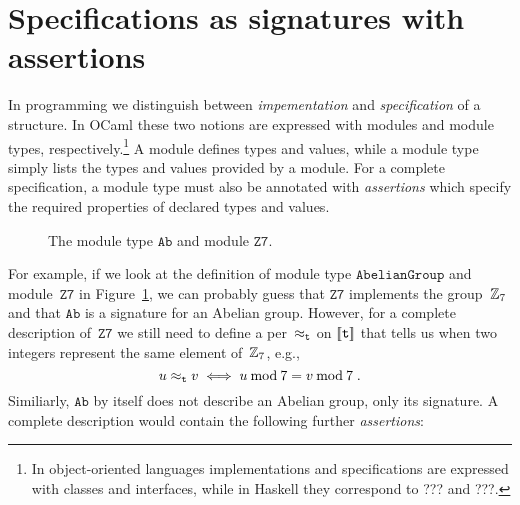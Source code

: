 \section{Specifications as signatures with assertions}
\label{sec:spec-sign-assert}


In programming we distinguish between \emph{impementation} and
\emph{specification} of a structure. In OCaml these two notions are
expressed with modules and module types, respectively.\footnote{In
  object-oriented languages implementations and specifications are
  expressed with classes and interfaces, while in Haskell they
  correspond to ??? and ???.} A module defines types and values, while
a module type simply lists the types and values provided by a module.
For a complete specification, a module type must also be annotated
with \emph{assertions} which specify the required properties of
declared types and values.
%
\begin{figure}
  \centering
  \caption{The module type $\mathtt{Ab}$ and module
    $\mathtt{Z7}$.}
  \label{fig:module-example}
\end{figure}
%
For example, if we look at the definition of module type
$\mathtt{AbelianGroup}$ and module~$\mathtt{Z7}$ in
Figure~\ref{fig:module-example}, we can probably guess that
$\mathtt{Z7}$ implements the group~$\mathbb{Z}_7$ and that $\mathtt{Ab}$ is a
signature for an Abelian group. However, for a complete description
of~$\mathtt{Z7}$ we still need to define a per~$\approx_{\mathtt{t}}$ on
$[\![\mathtt{t}]\!]$ that tells us when two integers represent the
same element of~$\mathbb{Z}_7$, e.g.,
%
\begin{equation*}
  u \approx_{\mathtt{t}} v \iff
  u \mathbin{\mathrm{mod}} 7 = v \mathbin{\mathrm{mod}} 7 \;.
\end{equation*}
%
Similiarly, $\mathtt{Ab}$ by itself does not describe an Abelian
group, only its signature. A complete description would contain the
following further \emph{assertions}:
%
